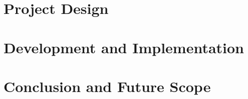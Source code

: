 \documentclass[12pt]{report}
\begin{document}
\chapter{Project Design}



%
\chapter{Development and Implementation}




\chapter{Conclusion and Future Scope}



%

\end{document}
